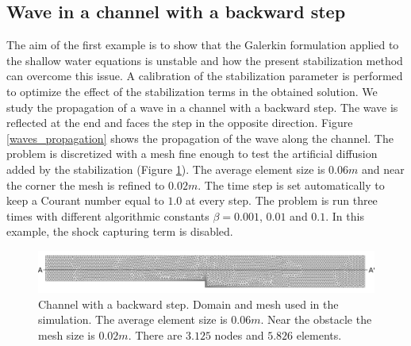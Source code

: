 \documentclass[a4paper,12pt]{article}
\begin{document}
\subsection{Wave in a channel with a backward step}

The aim of the first example is to show that the Galerkin formulation applied to the shallow water equations is unstable and how the present stabilization method can overcome this issue. A calibration of the stabilization parameter is performed to optimize the effect of the stabilization terms in the obtained solution.
We study the propagation of a wave in a channel with a backward step. The wave is reflected at the end and faces the step in the opposite direction. Figure \ref{waves_propagation} shows the propagation of the wave along the channel.
The problem is discretized with a mesh fine enough to test the artificial diffusion added by the stabilization (Figure \ref{step_mesh}). The average element size is $0.06m$ and near the corner the mesh is refined to $0.02m$.
The time step is set automatically to keep a Courant number equal to $1.0$ at every step. The problem is run three times with different algorithmic constants $\beta = 0.001$, $0.01$ and $0.1$. In this example, the shock capturing term is disabled.

\begin{figure}
    \includegraphics[width=\textwidth]{img/step/mesh.pdf}
    \caption{Channel with a backward step. Domain and mesh used in the simulation. The average element size is $0.06m$. Near the obstacle the mesh size is $0.02m$. There are $3.125$ nodes and $5.826$ elements.}
    \label{step_mesh}
\end{figure}
\end{document}
